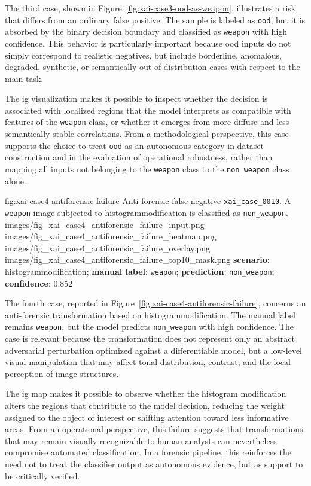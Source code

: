 The third case, shown in Figure~\ref{fig:xai-case3-ood-as-weapon}, illustrates a
risk that differs from an ordinary false positive. The sample is labeled as
\texttt{ood}, but it is absorbed by the binary decision boundary and classified
as \texttt{weapon} with high confidence. This behavior is particularly important
because \gls{ood} inputs do not simply correspond to realistic negatives, but
include borderline, anomalous, degraded, synthetic, or semantically
out-of-distribution cases with respect to the main task.

The \gls{ig} visualization makes it possible to inspect whether the decision is
associated with localized regions that the model interprets as compatible with
features of the \texttt{weapon} class, or whether it emerges from more diffuse
and less semantically stable correlations. From a methodological perspective,
this case supports the choice to treat \texttt{ood} as an autonomous category in
dataset construction and in the evaluation of operational robustness, rather
than mapping all inputs not belonging to the \texttt{weapon} class to the
\texttt{non\_weapon} class alone.

\XAIcaseFigureMaskGrid
{fig:xai-case4-antiforensic-failure}
{Anti-forensic false negative \texttt{xai\_case\_0010}. A \texttt{weapon} image
subjected to \gls{histogrammodification} is classified as
\texttt{non\_weapon}.}
{images/fig_xai_case4_antiforensic_failure_input.png}
{images/fig_xai_case4_antiforensic_failure_heatmap.png}
{images/fig_xai_case4_antiforensic_failure_overlay.png}
{images/fig_xai_case4_antiforensic_failure_top10_mask.png}
{\textbf{scenario}: \gls{histogrammodification};
\textbf{manual label}: \texttt{weapon};
\textbf{prediction}: \texttt{non\_weapon};
\textbf{confidence}: 0.852}

The fourth case, reported in
Figure~\ref{fig:xai-case4-antiforensic-failure}, concerns an anti-forensic
transformation based on \gls{histogrammodification}. The manual label remains
\texttt{weapon}, but the model predicts \texttt{non\_weapon} with high
confidence. The case is relevant because the transformation does not represent
only an abstract adversarial perturbation optimized against a differentiable
model, but a low-level visual manipulation that may affect tonal distribution,
contrast, and the local perception of image structures.

The \gls{ig} map makes it possible to observe whether the histogram modification
alters the regions that contribute to the model decision, reducing the weight
assigned to the object of interest or shifting attention toward less informative
areas. From an operational perspective, this failure suggests that
transformations that may remain visually recognizable to human analysts can
nevertheless compromise automated classification. In a forensic pipeline, this
reinforces the need not to treat the classifier output as autonomous evidence,
but as support to be critically verified.

